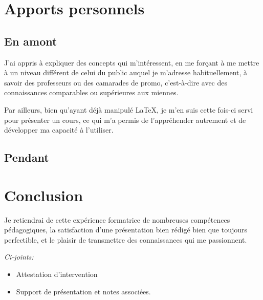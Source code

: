 \documentclass[12pt]{article}
\begin{document}
 \section{Apports personnels}
 \subsection{En amont}
J'ai appris à expliquer des concepts qui m'intéressent, en me forçant à me mettre à un niveau différent de celui du public auquel je m'adresse habituellement, à savoir des professeurs ou des camarades de promo, c'est-à-dire avec des connaissances
comparables ou supérieures aux miennes.

Par ailleurs, bien qu'ayant déjà manipulé \LaTeX, je m'en suis cette fois-ci servi pour présenter un cours, ce qui m'a permis de l'appréhender autrement et de développer ma capacité à l'utiliser.
 \subsection{Pendant}


 \section{Conclusion}

 Je retiendrai de cette expérience formatrice de nombreuses compétences pédagogiques, la satisfaction d'une présentation bien rédigé bien que toujours perfectible, et le plaisir de transmettre des connaissances qui me passionnent.\\[2em]
{\it
 Ci-joints:
 \begin{itemize}
   \item Attestation d'intervention
   \item Support de présentation et notes associées.
 \end{itemize}
 }
\end{document}

